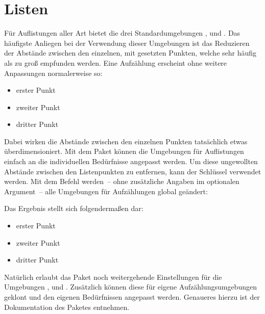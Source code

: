 \documentclass[%
  english,ngerman,%
  geometry=no,DIV=12,automark,%
]{tudscrartcl}
\begin{document}
\section{Listen}
\label{sec:lists}
Für Auflistungen aller Art bietet  die drei Standardumgebungen 
,  und . 
Das häufigste Anliegen bei der Verwendung dieser Umgebungen ist das Reduzieren 
der Abstände zwischen den einzelnen, mit  gesetzten Punkten, welche 
sehr häufig als zu groß empfunden werden. Eine Aufzählung erscheint ohne 
weitere Anpassungen normalerweise so:
%
\begin{Hint}
\begin{itemize}
\item erster Punkt
\item zweiter Punkt
\item dritter Punkt
\end{itemize}
\end{Hint}
%
Dabei wirken die Abstände zwischen den einzelnen Punkten tatsächlich etwas 
überdimensioniert. Mit dem Paket  können die Umgebungen für 
Auflistungen einfach an die individuellen Bedürfnisse angepasst werden. Um 
diese ungewollten Abstände zwischen den Listenpunkten zu entfernen, kann der 
Schlüssel  verwendet werden. Mit dem Befehl  
werden~-- ohne zusätzliche Angaben im optionalen Argument~-- alle Umgebungen 
für Aufzählungen global geändert:
%
\begin{Excerpt}
\end{Excerpt}
%
Das Ergebnis stellt sich folgendermaßen dar:
%
\begin{Excerpt}
\begin{itemize}
\item erster Punkt
\item zweiter Punkt
\item dritter Punkt
\end{itemize}
\end{Excerpt}
%
Natürlich erlaubt das Paket noch weitergehende Einstellungen für die Umgebungen 
,  und . 
Zusätzlich können diese für eigene Aufzählungsumgebungen geklont und den 
eigenen Bedürfnissen angepasst werden. Genaueres hierzu ist der Dokumentation 
des Paketes  entnehmen.
\end{document}
